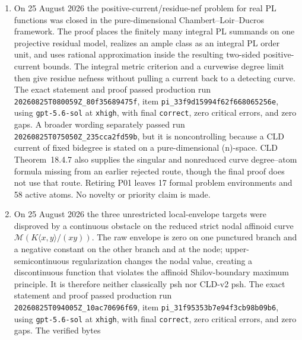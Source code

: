 \begin{enumerate}
  construction passed run \texttt{20260825T055907Z\_b5c8f0719b60}, item
  \texttt{pi\_d80993bb01a748f0422ae6a5}, with the same clean verdict and
  disproves local uniform, hence decreasing, approximation of every harmonic
  function by ordinary CLD-smooth harmonic functions.  It does not address
  ordinary CLD-smooth psh regularization, which remains one of the 59 active
  atoms.  No novelty or priority claim is made for either book-level
  consequence.
\item On 25 August 2026 the positive-current/residue-nef problem for real PL
  functions was closed in the pure-dimensional Chambert--Loir--Ducros
  framework.  The proof places the finitely many integral PL summands on one
  projective residual model, realizes an ample class as an integral PL
  order unit, and uses rational approximation inside the resulting
  two-sided positive-current bounds.  The integral metric criterion and a
  curvewise degree limit then give residue nefness without pulling a current
  back to a detecting curve.  The exact statement and proof passed
  production run \texttt{20260825T080059Z\_80f35689475f}, item
  \texttt{pi\_33f9d15994f62f668065256e}, using
  \texttt{gpt-5.6-sol} at \texttt{xhigh}, with final \texttt{correct}, zero
  critical errors, and zero gaps.  A broader wording separately passed run
  \texttt{20260825T075050Z\_235cca2fd59b}, but it is noncontrolling because
  a CLD current of fixed bidegree is stated on a pure-dimensional
  (n)-space.  CLD Theorem~18.4.7 also supplies the singular and nonreduced
  curve degree--atom formula missing from an earlier rejected route, though
  the final proof does not use that route.  Retiring P01 leaves 17 formal
  problem environments and 58 active atoms.  No novelty or priority claim
  is made.
\item On 25 August 2026 the three unrestricted local-envelope targets were
  disproved by a continuous obstacle on the reduced strict nodal affinoid
  curve
  \(\mathcal M(K\langle x,y\rangle/(xy))\).  The raw envelope is zero on
  one punctured branch and a negative constant on the other branch and at
  the node; upper-semicontinuous regularization changes the nodal value,
  creating a discontinuous function that violates the affinoid
  Shilov-boundary maximum principle.  It is therefore neither classically
  psh nor CLD-v2 psh.  The exact statement and proof passed production run
  \texttt{20260825T094005Z\_10ac70696f69}, item
  \texttt{pi\_31f95353b7e94f3cb98b09b6}, using
  \texttt{gpt-5.6-sol} at \texttt{xhigh}, with final
  \texttt{correct}, zero critical errors, and zero gaps.  The verified bytes

\end{enumerate}
